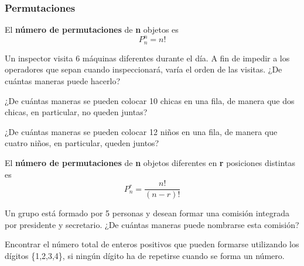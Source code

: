 \documentclass[]{presentacion}
\begin{document}
\begin{frame}

\frametitle{Permutaciones}

\begin{teorema}
  El \textbf{número de permutaciones} de \textbf{n} objetos es
  \begin{equation*}
    P_n^n = n!
  \end{equation*}
\end{teorema}

\begin{problema}
  Un inspector visita 6 máquinas diferentes durante el día. A fin
  de impedir a los operadores que sepan cuando inspeccionará, varía el orden
  de las visitas. ¿De cuántas maneras puede hacerlo?
\end{problema}



\end{frame}

\begin{frame}

\begin{problema}
  ¿De cuántas maneras se pueden colocar 10 chicas en una fila, de
  manera que dos chicas, en particular, no queden juntas?
\end{problema}

\begin{problema}
  ¿De cuántas maneras se pueden colocar 12 niños en una fila, de
  manera que cuatro niños, en particular, queden juntos?
\end{problema}

\end{frame}

\begin{frame}
  \begin{teorema}
    El \textbf{número de permutaciones} de \textbf{n} objetos diferentes en \textbf{r}
    posiciones distintas es
    \begin{equation*}
      P_n^r = \dfrac{n!}{(n-r)!}
    \end{equation*}
  \end{teorema}

  \begin{problema}
    Un grupo está formado por 5 personas y desean formar una comisión
    integrada por presidente y secretario. ¿De cuántas maneras puede nombrarse
    esta comisión?
  \end{problema}
\end{frame}

\begin{frame}
  \begin{problema}
    Encontrar el número total de enteros positivos que pueden formarse
    utilizando los dígitos \{1,2,3,4\}, si ningún dígito ha de repetirse cuando
    se forma un número.
  \end{problema}
\end{frame}
\end{document}
